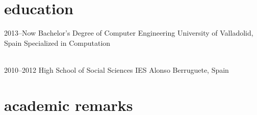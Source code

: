 \documentclass[]{friggeri-cv} %
\begin{document}



    \section{education}

        \begin{entrylist}

            \entry
            {2013--Now}
            {Bachelor's Degree {\normalfont of Computer Engineering}}
            {University of Valladolid, Spain}
            {Specialized in Computation}

            \\
            \entry
            {2010--2012}
            {High School {\normalfont of Social Sciences}}
            {IES Alonso Berruguete, Spain}
            {}

        \end{entrylist}




    \section{academic remarks}
\end{document}
